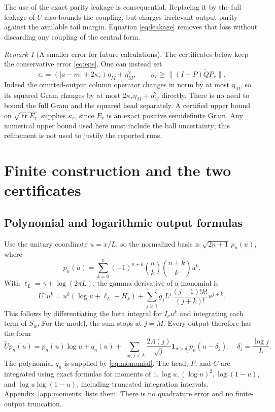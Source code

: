 \documentclass[11pt]{article}
\numberwithin{equation}{section}
\theoremstyle{definition}
\theoremstyle{remark}
\newtheorem{remark}[theorem]{Remark}
\newcommand{\tr}{\operatorname{tr}}
\newcommand{\norm}[1]{\lVert#1\rVert}
\begin{document}
The use of the exact parity leakage is consequential. Replacing it by
the full leakage of $\widetilde U$ also bounds the coupling, but charges
irrelevant output parity against the available tail margin. Equation
\eqref{eq:leakage} removes that loss without discarding any coupling of
the central form.

\begin{remark}[A smaller error for future calculations]\label{rem:sharper-error}
The certificates below keep the conservative error \eqref{eq:eps}.
One can instead set
\[
 \epsilon_r=(|a-m|+2\kappa_r)\eta_M+\eta_M^2,
 \qquad \kappa_r\ge\norm{(I-P)\widetilde QP_r}.
\]
Indeed the omitted-output column operator changes in norm by at most
$\eta_M$, so its squared Gram changes by at most
$2\kappa_r\eta_M+\eta_M^2$ directly. There is no need to bound the full
Gram and the squared head separately. A certified upper bound on
$\sqrt{\tr E_r}$ supplies $\kappa_r$, since $E_r$ is an exact positive
semidefinite Gram. Any numerical upper bound used here must include the
ball uncertainty; this refinement is not used to justify the reported runs.
\end{remark}

\section{Finite construction and the two certificates}\label{sec:computation}

\subsection{Polynomial and logarithmic output formulas}

Use the unitary coordinate $u=x/L$, so the normalized basis is
$\sqrt{2n+1}\,p_n(u)$, where
\begin{equation}\label{eq:legpoly}
 p_n(u)=\sum_{k=0}^n(-1)^{n+k}\binom nk\binom{n+k}k u^k.
\end{equation}
With $\ell_L=\gamma+\log(2\pi L)$, the gamma derivative of a monomial is
\begin{equation}\label{eq:monomial}
 U^\gamma u^k=u^k(\log u+\ell_L-H_k)
 +\sum_{j\ge1}g_jL^j\frac{(j-1)!k!}{(j+k)!}u^{j+k}.
\end{equation}
This follows by differentiating the beta integral for $I_\nu u^k$ and
integrating each term of $S_w$. For the model, the sum stops at $j=M$.
Every output therefore has the form
\begin{equation}\label{eq:output}
 \widetilde Up_n(u)=p_n(u)\log u+q_n(u)
 +\sum_{\log j<L}\frac{2\Lambda(j)}{\sqrt j}
   \mathbf1_{u>\delta_j}p_n(u-\delta_j),
 \quad \delta_j=\frac{\log j}{L}.
\end{equation}
The polynomial $q_n$ is supplied by \eqref{eq:monomial}.
The head, $F$, and $C$ are integrated using exact formulas for moments of
$1,\log u,(\log u)^2,\log(1-u)$, and $\log u\log(1-u)$, including
truncated integration intervals. Appendix~\ref{app:moments} lists them.
There is no quadrature error and no finite-output truncation.
\end{document}

